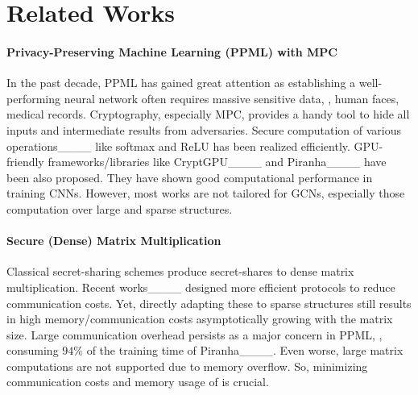 \section{Related Works}
\label{supp::work}
 
\paragraph{Privacy-Preserving Machine Learning (PPML) with MPC}
In the past decade, PPML has gained great attention as establishing a well-performing neural network often requires massive sensitive data, \eg, human faces, medical records.
Cryptography, especially MPC,
provides a handy tool to 
hide all inputs and intermediate results from adversaries.
Secure computation of various operations____ like softmax
and ReLU has been realized efficiently.
GPU-friendly frameworks/libraries like %
CryptGPU____ and Piranha____ have been also proposed.
They have shown good computational performance in training CNNs.
However, most works are not tailored for %
GCNs, especially those computation over large and sparse structures.

\paragraph{Secure (Dense) Matrix Multiplication}
Classical secret-sharing schemes produce secret-shares to dense matrix multiplication.
Recent works____ designed more efficient protocols to reduce communication costs.
Yet, directly adapting these to sparse structures still results in high memory/communication costs asymptotically growing with the matrix size.
Large communication overhead persists as a major concern in PPML, \eg, consuming $94\%$ of the training time of Piranha____.
Even worse, large matrix computations are not supported due to memory overflow.
So, minimizing communication costs and memory usage of \osmm is crucial.

